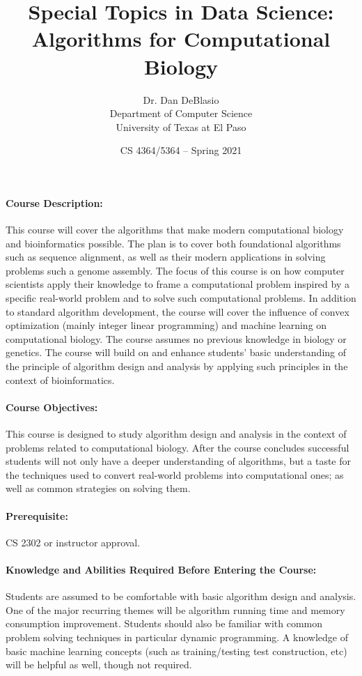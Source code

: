 \documentclass[12pt]{scrartcl}
\title{\large Special Topics in Data Science: \\
\LARGE Algorithms for Computational  Biology}\let\Title\@title
\subtitle{
{\small
\vskip0.5cm
Dr. Dan DeBlasio\\
Department of Computer Science \\
University of Texas at El Paso}
\vskip-1cm}
\date{\small CS 4364/5364 -- Spring 2021}
\begin{document}

\maketitle


\paragraph{Course Description:} 
This course will cover the algorithms that make modern computational biology and bioinformatics possible. 
The plan is to cover both foundational algorithms such as sequence alignment, 
as well as their modern applications in solving problems such a genome assembly. 
The focus of this course is on how computer scientists apply their knowledge to frame a computational problem inspired by a specific real-world problem 
and to solve such computational problems. 
In addition to standard algorithm development, 
the course will cover the influence of convex optimization (mainly integer linear programming) and machine learning on computational biology. 
The course assumes no previous knowledge in biology or genetics. 
The course will build on and enhance students’ basic understanding of the principle of algorithm design and analysis by applying such principles in the context of bioinformatics.


\paragraph{Course Objectives:} This course is designed to study algorithm design and analysis in the context of problems related to computational biology. 
After the course concludes successful students will not only have a deeper understanding of algorithms, but a taste for the techniques used to convert real-world problems into computational ones;
as well as common strategies on solving them. 


\paragraph{Prerequisite:} CS 2302 or instructor approval. 

\paragraph{Knowledge and Abilities Required Before Entering the Course:} Students are assumed to be comfortable with basic algorithm design and analysis. 
One of the major recurring themes will be algorithm running time and memory consumption improvement. 
Students should also be familiar with common problem solving techniques in particular dynamic programming.
A knowledge of basic machine learning concepts (such as training/testing test construction, etc) will be helpful as well, though not required. 
\end{document}
